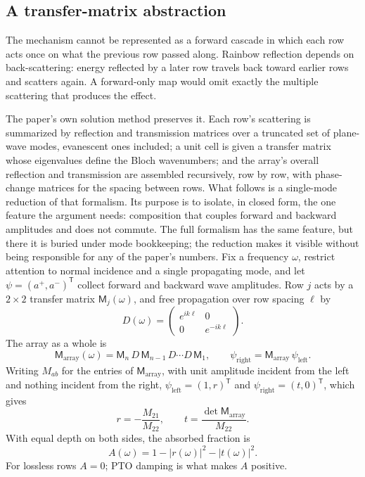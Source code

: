 \documentclass[11pt]{article}
\theoremstyle{definition}
\begin{document}
\subsection{A transfer-matrix abstraction}

The mechanism cannot be represented as a forward cascade in which each row acts once on what the previous row passed along. Rainbow reflection depends on back-scattering: energy reflected by a later row travels back toward earlier rows and scatters again. A forward-only map would omit exactly the multiple scattering that produces the effect.

The paper's own solution method preserves it. Each row's scattering is summarized by reflection and transmission matrices over a truncated set of plane-wave modes, evanescent ones included; a unit cell is given a transfer matrix whose eigenvalues define the Bloch wavenumbers; and the array's overall reflection and transmission are assembled recursively, row by row, with phase-change matrices for the spacing between rows. What follows is a single-mode reduction of that formalism. Its purpose is to isolate, in closed form, the one feature the argument needs: composition that couples forward and backward amplitudes and does not commute. The full formalism has the same feature, but there it is buried under mode bookkeeping; the reduction makes it visible without being responsible for any of the paper's numbers. Fix a frequency $\omega$, restrict attention to normal incidence and a single propagating mode, and let $\psi=(a^{+},a^{-})^{\mathsf T}$ collect forward and backward wave amplitudes. Row $j$ acts by a $2\times 2$ transfer matrix $\mathsf M_j(\omega)$, and free propagation over row spacing $\ell$ by
\begin{equation}
D(\omega)=\begin{pmatrix} e^{ik\ell} & 0\\ 0 & e^{-ik\ell}\end{pmatrix}.
\end{equation}
The array as a whole is
\begin{equation}
\mathsf M_{\mathrm{array}}(\omega)=\mathsf M_n\,D\,\mathsf M_{n-1}\,D\cdots D\,\mathsf M_1 ,
\qquad \psi_{\mathrm{right}}=\mathsf M_{\mathrm{array}}\,\psi_{\mathrm{left}} .
\end{equation}
Writing $M_{ab}$ for the entries of $\mathsf M_{\mathrm{array}}$, with unit amplitude incident from the left and nothing incident from the right, $\psi_{\mathrm{left}}=(1,r)^{\mathsf T}$ and $\psi_{\mathrm{right}}=(t,0)^{\mathsf T}$, which gives
\begin{equation}
r=-\frac{M_{21}}{M_{22}},\qquad t=\frac{\det\mathsf M_{\mathrm{array}}}{M_{22}} .
\end{equation}
With equal depth on both sides, the absorbed fraction is
\begin{equation}
A(\omega)=1-|r(\omega)|^{2}-|t(\omega)|^{2}.
\end{equation}
For lossless rows $A=0$; PTO damping is what makes $A$ positive.
\end{document}
